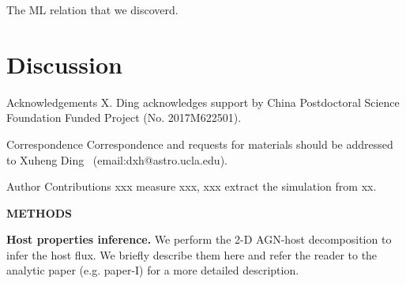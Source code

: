 \documentclass{natureprintstyle}
\newcommand{\hst}{{\it HST}}
\newcommand{\mbh}{$\mathcal M_{\rm BH}$}
\newcommand{\halpha}{${\it H}\alpha$}
\newcommand{\hbeta}{${\it H}\beta$}
\newcommand{\Mgii}{Mg$_{\rm II}$}
\newcommand{\Civ}{C$_{\rm IV}$}
\begin{document}
The ML relation that we discoverd.


\section{Discussion}


\begin{addendum}
 \item[Acknowledgements] 
X. Ding acknowledges support by China Postdoctoral Science Foundation Funded Project (No. 2017M622501).

%
\item[Correspondence] Correspondence and requests for materials should be addressed to Xuheng Ding ~(email:dxh@astro.ucla.edu).
\item[Author Contributions] xxx measure xxx, xxx extract the simulation from xx.
\end{addendum}

\clearpage
\newpage

\begin{center}
{\bf \Large \uppercase{Methods} }
\end{center}


\textbf{Host properties inference.} We perform the 2-D AGN-host decomposition to infer the host flux. We briefly describe them here and refer the reader to the analytic paper (e.g. paper-I) for a more detailed description.
\end{document}
